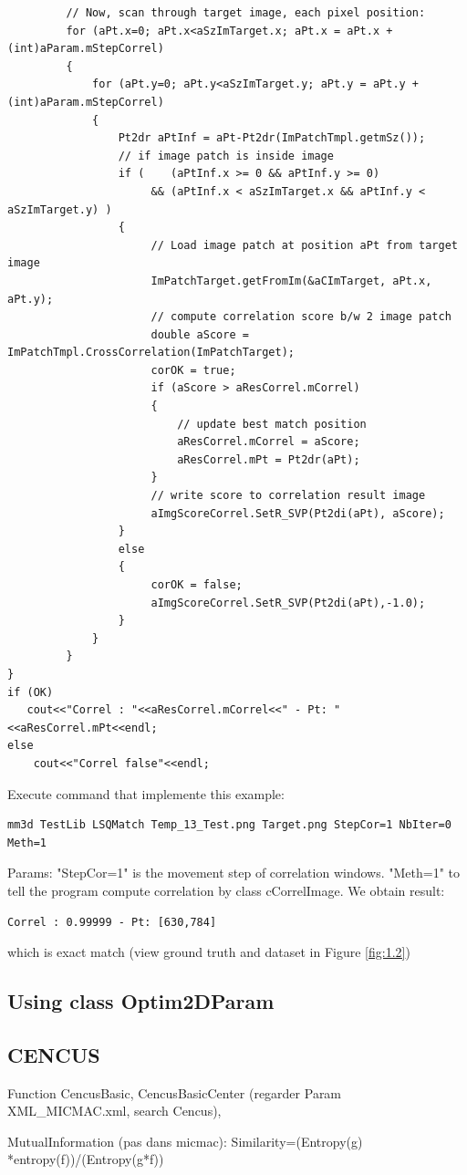 \documentclass[twoside]{article}
\begin{document}
\begin{lstlisting}
         // Now, scan through target image, each pixel position:
         for (aPt.x=0; aPt.x<aSzImTarget.x; aPt.x = aPt.x + (int)aParam.mStepCorrel)       
         {
             for (aPt.y=0; aPt.y<aSzImTarget.y; aPt.y = aPt.y + (int)aParam.mStepCorrel)
             {
                 Pt2dr aPtInf = aPt-Pt2dr(ImPatchTmpl.getmSz());
                 // if image patch is inside image
                 if (    (aPtInf.x >= 0 && aPtInf.y >= 0)
                      && (aPtInf.x < aSzImTarget.x && aPtInf.y < aSzImTarget.y) )
                 {
                      // Load image patch at position aPt from target image
                      ImPatchTarget.getFromIm(&aCImTarget, aPt.x, aPt.y);
                      // compute correlation score b/w 2 image patch
                      double aScore = ImPatchTmpl.CrossCorrelation(ImPatchTarget);
                      corOK = true;
                      if (aScore > aResCorrel.mCorrel)
                      {
                      	  // update best match position
                          aResCorrel.mCorrel = aScore;
                          aResCorrel.mPt = Pt2dr(aPt);
                      }
                      // write score to correlation result image
                      aImgScoreCorrel.SetR_SVP(Pt2di(aPt), aScore);
                 }
                 else
                 {
                      corOK = false;
                      aImgScoreCorrel.SetR_SVP(Pt2di(aPt),-1.0);
                 }
             }
         }
}
if (OK)
   cout<<"Correl : "<<aResCorrel.mCorrel<<" - Pt: "<<aResCorrel.mPt<<endl;
else
    cout<<"Correl false"<<endl;
\end{lstlisting}

Execute command that implemente this example:
\begin{verbatim}
mm3d TestLib LSQMatch Temp_13_Test.png Target.png StepCor=1 NbIter=0 Meth=1
\end{verbatim}
Params: "StepCor=1" is the movement step of correlation windows. "Meth=1" to tell the program compute correlation by class {\color{blue}cCorrelImage}. We obtain result:
\begin{verbatim}
Correl : 0.99999 - Pt: [630,784]
\end{verbatim}
which is exact match (view ground truth and dataset in Figure \ref{fig:1.2})

\subsection{Using class Optim2DParam}

\subsection{CENCUS}
Function CencusBasic, CencusBasicCenter (regarder Param XML\_MICMAC.xml, search Cencus), 

MutualInformation (pas dans micmac): Similarity=(Entropy(g) *entropy(f))/(Entropy(g*f))
\end{document}
